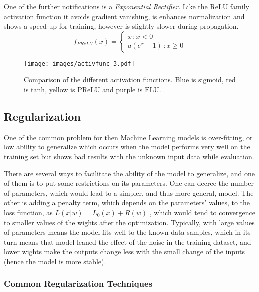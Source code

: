 One of the further notifications is a \textit{Exponential Rectifier}.
Like the ReLU family activation function it avoids gradient vanishing, is enhances normalization and shows a speed up for training\cite{bibl:elu}, however is slightly slower during propagation. 
\[ f_{PReLU}(x) = 
\begin{cases}
x \, :x<0 \\
a(e^{x}-1) \, : x \geq 0
\end{cases}
\]

\begin{figure}[]
	\centering
	\texttt{[image: images/activfunc\_3.pdf]}
	\caption{Comparison of the different activation functions. Blue is $\mathrm{sigmoid}$, red is $\mathrm{tanh}$, yellow is $\mathrm{PReLU}$ and purple is $\mathrm{ELU}$.}
	\label{fig:act_func}
\end{figure}


\subsection{Regularization}

One of the common problem for then Machine Learning models is over-fitting, or low ability to generalize which occurs when the model performs very well on the training set but shows bad results with the unknown input data while evaluation.
\medskip

There are several ways to facilitate the ability of the model to generalize, and one of them is to put some restrictions on its parameters.
One can decree the number of parameters, which would lead to a simpler, and thus more general, model.
The other is adding a penalty term, which depends on the parameters' values, to the loss function, as $L(x|w) = L_{0}(x) + R(w)$ , which would tend to convergence to smaller values of the wights after the optimization. 
Typically, with large values of parameters means the model fits well to the known data samples, which in its turn means that model leaned the effect of the noise in the training dataset, and lower wights make the outputs change less with the small change of the inputs (hence the model is more stable).
\medskip

\subsubsection{Common Regularization Techniques}

